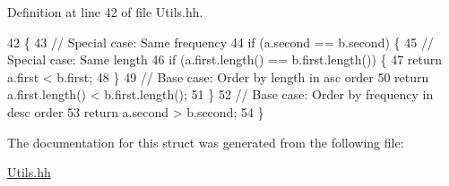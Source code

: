 Definition at line 42 of file Utils.\+hh.


\begin{DoxyCode}
42                                                                                 \{
43             \textcolor{comment}{// Special case: Same frequency}
44             \textcolor{keywordflow}{if} (a.second == b.second) \{
45                 \textcolor{comment}{// Special case: Same length}
46                 \textcolor{keywordflow}{if} (a.first.length() == b.first.length()) \{
47                     \textcolor{keywordflow}{return} a.first < b.first;
48                 \}
49                 \textcolor{comment}{// Base case: Order by length in asc order}
50                 \textcolor{keywordflow}{return} a.first.length() < b.first.length();
51             \}
52             \textcolor{comment}{// Base case: Order by frequency in desc order}
53             \textcolor{keywordflow}{return} a.second > b.second;
54         \}
\end{DoxyCode}


The documentation for this struct was generated from the following file\+:\begin{DoxyCompactItemize}
\item 
\hyperlink{_utils_8hh}{Utils.\+hh}\end{DoxyCompactItemize}
